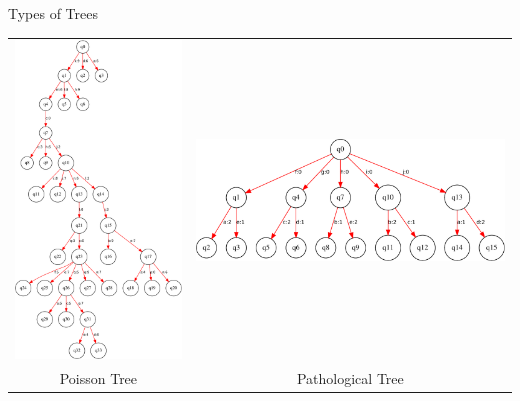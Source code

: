 \begin{tframe}{Types of Trees}
\begin{center}
\begin{tabular}{cc}
\includegraphics[scale=0.2]{media_minrep/big_tree}&
\includegraphics[scale=0.2]{media_minrep/big_patho_tree}\\
Poisson Tree &
Pathological Tree
\end{tabular}
\end{center}
\end{tframe}

